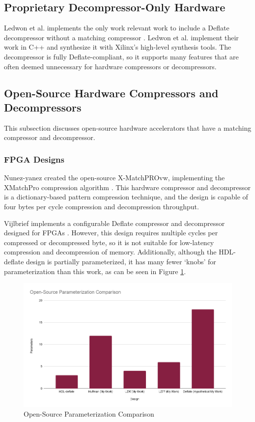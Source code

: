 \documentclass[doublespace,nopageskip]{VTthesis}
\begin{document}
\subsection{Proprietary Decompressor-Only Hardware}\label{ss:proprietary_decompressor-only_hardware}
Ledwon et al. implements the only work relevant work to include a Deflate decompressor without a matching compressor \cite{deflatedecompression}. Ledwon et al. implement their work in C++ and synthesize it with Xilinx's high-level synthesis tools. The decompressor is fully Deflate-compliant, so it supports many features that are often deemed unnecessary for hardware compressors or decompressors.

\subsection{Open-Source Hardware Compressors and Decompressors}\label{ss:open-source_hardware_compressors_and_decompressors}
This subsection discusses open-source hardware accelerators that have a matching compressor and decompressor.

\subsubsection{FPGA Designs}\label{sss:open_fpga_designs}
Nunez-yanez created the open-source X-MatchPROvw, implementing the XMatchPro compression algorithm \cite{xmatchpro}. This hardware compressor and decompressor is a dictionary-based pattern compression technique, and the design is capable of four bytes per cycle compression and decompression throughput.

Vijlbrief implements a configurable Deflate compressor and decompressor designed for FPGAs \cite{hdldeflate}. However, this design requires multiple cycles per compressed or decompressed byte, so it is not suitable for low-latency compression and decompression of memory. Additionally, although the HDL-deflate design is partially parameterized, it has many fewer `knobs' for parameterization than this work, as can be seen in Figure \ref{fig:open-source_parameterization_comparison}.

\begin{figure}[htb]
	\centering
	\includegraphics[scale=0.44]{Open-Source Parameterization Comparison.png}
	\caption{Open-Source Parameterization Comparison}
	\label{fig:open-source_parameterization_comparison}
\end{figure}
\end{document}
